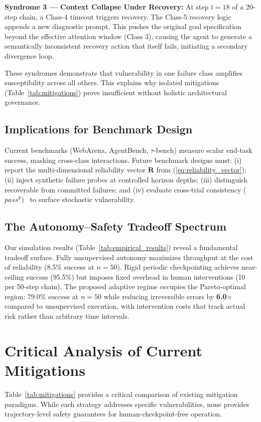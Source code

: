\documentclass[conference]{IEEEtran}
\begin{document}
\textbf{Syndrome 3 --- Context Collapse Under Recovery:} At step $t=18$ of a 20-step chain, a Class-4 timeout triggers recovery. The Class-5 recovery logic appends a new diagnostic prompt. This pushes the original goal specification beyond the effective attention window (Class 3), causing the agent to generate a semantically inconsistent recovery action that itself fails, initiating a secondary divergence loop.

These syndromes demonstrate that vulnerability in one failure class amplifies susceptibility across all others. This explains why isolated mitigations (Table~\ref{tab:mitigations}) prove insufficient without holistic architectural governance.

\subsection{Implications for Benchmark Design}
Current benchmarks (WebArena, AgentBench, $\tau$-bench) measure scalar end-task success, masking cross-class interactions. Future benchmark designs must: (i) report the multi-dimensional reliability vector $\mathbf{R}$ from (\ref{eq:reliability_vector}); (ii) inject synthetic failure probes at controlled horizon depths; (iii) distinguish recoverable from committed failures; and (iv) evaluate cross-trial consistency ($pass^k$)~\cite{yao2025taubench} to surface stochastic vulnerability.

\subsection{The Autonomy--Safety Tradeoff Spectrum}
Our simulation results (Table~\ref{tab:empirical_results}) reveal a fundamental tradeoff surface. Fully unsupervised autonomy maximizes throughput at the cost of reliability (8.5\% success at $n=50$). Rigid periodic checkpointing achieves near-ceiling success (95.5\%) but imposes fixed overhead in human interventions (10 per 50-step chain). The proposed adaptive regime occupies the Pareto-optimal region: 79.0\% success at $n=50$ while reducing irreversible errors by \textbf{6.0$\times$} compared to unsupervised execution, with intervention costs that track actual risk rather than arbitrary time intervals.

\section{Critical Analysis of Current Mitigations}
Table~\ref{tab:mitigations} provides a critical comparison of existing mitigation paradigms. While each strategy addresses specific vulnerabilities, none provides trajectory-level safety guarantees for human-checkpoint-free operation.
\end{document}
